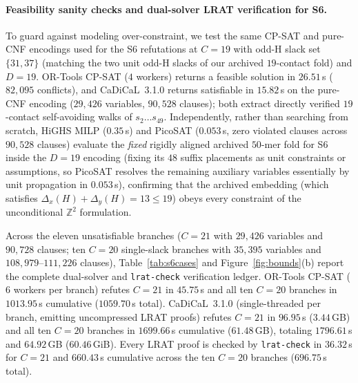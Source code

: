 \documentclass[11pt]{article}
\newcommand{\Z}{\mathbb{Z}}
\begin{document}
\paragraph{Feasibility sanity checks and dual-solver LRAT verification for S6.}
To guard against modeling over-constraint, we test the same CP-SAT and pure-CNF encodings used for the S6 refutations at $C = 19$ with odd-H slack set $\{31, 37\}$ (matching the two unit odd-H slacks of our archived $19$-contact fold) and $D = 19$. OR-Tools CP-SAT ($4$ workers) returns a feasible solution in $26.51\,$s ($82{,}095$ conflicts), and CaDiCaL~3.1.0 returns satisfiable in $15.82\,$s on the pure-CNF encoding ($29{,}426$ variables, $90{,}528$ clauses); both extract directly verified $19$-contact self-avoiding walks of $s_2 \dots s_{49}$. Independently, rather than searching from scratch, HiGHS MILP ($0.35\,$s) and PicoSAT ($0.053\,$s, zero violated clauses across $90{,}528$ clauses) evaluate the \emph{fixed} rigidly aligned archived $50$-mer fold for S6 inside the $D = 19$ encoding (fixing its $48$ suffix placements as unit constraints or assumptions, so PicoSAT resolves the remaining auxiliary variables essentially by unit propagation in $0.053\,$s), confirming that the archived embedding (which satisfies $\Delta_x(H) + \Delta_y(H) = 13 \le 19$) obeys every constraint of the unconditional $\Z^2$ formulation.

Across the eleven unsatisfiable branches ($C = 21$ with $29{,}426$ variables and $90{,}728$ clauses; ten $C = 20$ single-slack branches with $35{,}395$ variables and $108{,}979$--$111{,}226$ clauses), Table~\ref{tab:s6cases} and Figure~\ref{fig:bounds}(b) report the complete dual-solver and \texttt{lrat-check} verification ledger. OR-Tools CP-SAT ($6$ workers per branch) refutes $C = 21$ in $45.75\,$s and all ten $C = 20$ branches in $1013.95\,$s cumulative ($1059.70\,$s total). CaDiCaL~3.1.0 (single-threaded per branch, emitting uncompressed LRAT proofs) refutes $C = 21$ in $96.95\,$s ($3.44\,$GB) and all ten $C = 20$ branches in $1699.66\,$s cumulative ($61.48\,$GB), totaling $1796.61\,$s and $64.92\,$GB ($60.46\,$GiB). Every LRAT proof is checked by \texttt{lrat-check} in $36.32\,$s for $C = 21$ and $660.43\,$s cumulative across the ten $C = 20$ branches ($696.75\,$s total).
\end{document}
